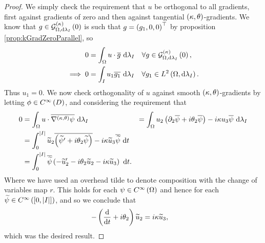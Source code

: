 \begin{proof}
	We simply check the requirement that $u$ be orthogonal to all gradients, first against gradients of zero and then against tangential $\left( \kappa, \theta \right)$-gradients.
	We know that $g\in\mathcal{G}_{ \Omega, \mathrm{d}\lambda_I}^{(\kappa)}\left( 0 \right)$ is such that $g=\left( g_1,0,0 \right)^\top$ by proposition \ref{prop:kGradZeroParallel}, so
	\begin{align*}
		0 &= \int_{\Omega} u\cdot\overline{g}  \ \mathrm{d}\lambda_I \quad\forall g\in\mathcal{G}_{ \Omega, \mathrm{d}\lambda_I}^{(\kappa)}\left( 0 \right), \\
		\implies 0 &= \int_{I} u_1 \overline{g_1}  \ \mathrm{d}\lambda_I \quad \forall g_1\in L^{2}\left( \Omega,\mathrm{d}\lambda_I \right).
	\end{align*}
	Thus $u_1 = 0$.
	We now check orthogonality of $u$ against smooth $\left( \kappa, \theta \right)$-gradients by letting $\phi\in C^{\infty}\left( D \right)$, and considering the requirement that
	\begin{align*}
		0 &= \int_{\Omega} u\cdot\overline{\nabla^{\left( \kappa, \theta \right)}\psi}  \ \mathrm{d}\lambda_I
		&= \int_{\Omega}u_2\left( \partial_2\overline{\psi} + i\theta_2\overline{\psi} \right) - i\kappa u_3\overline{\psi} \ \mathrm{d}\lambda_I \\
		&= \int_0^{\left\lvert I \right\rvert} \widetilde{u}_2\overline{\left( \widetilde{\psi}' + i\theta_2 \widetilde{\psi} \right)} - i\kappa\widetilde{u}_3\overline{\widetilde{\psi}} \ \mathrm{d} t \\
		&= \int_0^{\left\lvert I \right\rvert} \overline{\widetilde{\psi}}\left( -\widetilde{u}'_2 - i\theta_2 \widetilde{u}_2 - i\kappa\widetilde{u}_3 \right) \ \mathrm{d} t.
	\end{align*}
	Where we have used an overhead tilde to denote composition with the change of variables map $r$.
	This holds for each $\psi\in C^{\infty}\left( \Omega \right)$ and hence for each $\widetilde{\psi}\in C^{\infty}\left( \left[ 0,\left\lvert I \right\rvert \right] \right)$, and so we conclude that
	\begin{align*}
		-\left( \dfrac{\mathrm{d}}{\mathrm{d}t} + i\theta_2 \right)\widetilde{u}_2 &= i\kappa\widetilde{u}_3,
	\end{align*}
	which was the desired result.
\end{proof}

